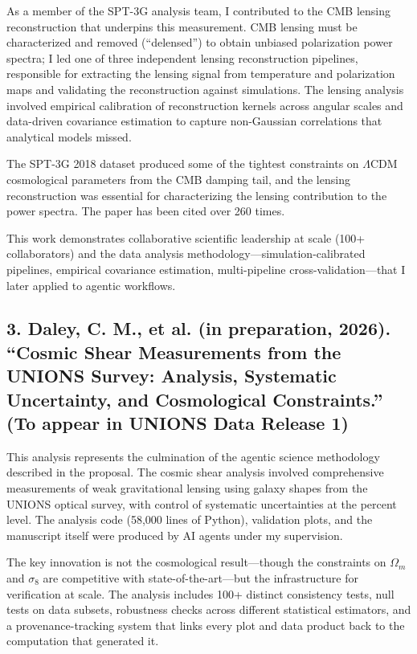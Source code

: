 \documentclass[11pt,a4paper]{article}
\begin{document}
As a member of the SPT-3G analysis team, I contributed to the CMB lensing reconstruction that underpins this measurement. CMB lensing must be characterized and removed (``delensed'') to obtain unbiased polarization power spectra; I led one of three independent lensing reconstruction pipelines, responsible for extracting the lensing signal from temperature and polarization maps and validating the reconstruction against simulations. The lensing analysis involved empirical calibration of reconstruction kernels across angular scales and data-driven covariance estimation to capture non-Gaussian correlations that analytical models missed.

The SPT-3G 2018 dataset produced some of the tightest constraints on $\Lambda$CDM cosmological parameters from the CMB damping tail, and the lensing reconstruction was essential for characterizing the lensing contribution to the power spectra. The paper has been cited over 260 times.

This work demonstrates collaborative scientific leadership at scale (100+ collaborators) and the data analysis methodology---simulation-calibrated pipelines, empirical covariance estimation, multi-pipeline cross-validation---that I later applied to agentic workflows.

\subsection*{3. Daley, C. M., et al. (in preparation, 2026). ``Cosmic Shear Measurements from the UNIONS Survey: Analysis, Systematic Uncertainty, and Cosmological Constraints.'' (To appear in UNIONS Data Release 1)}

This analysis represents the culmination of the agentic science methodology described in the proposal. The cosmic shear analysis involved comprehensive measurements of weak gravitational lensing using galaxy shapes from the UNIONS optical survey, with control of systematic uncertainties at the percent level. The analysis code (58,000 lines of Python), validation plots, and the manuscript itself were produced by AI agents under my supervision.

The key innovation is not the cosmological result---though the constraints on $\Omega_m$ and $\sigma_8$ are competitive with state-of-the-art---but the infrastructure for verification at scale. The analysis includes 100+ distinct consistency tests, null tests on data subsets, robustness checks across different statistical estimators, and a provenance-tracking system that links every plot and data product back to the computation that generated it.
\end{document}
